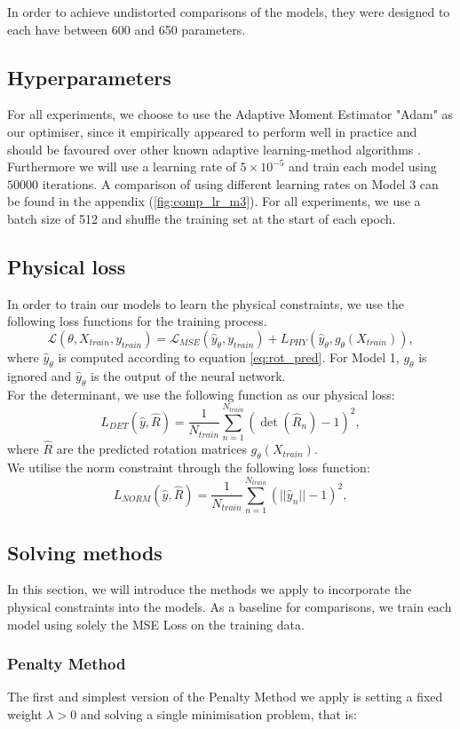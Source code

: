 \indent In order to achieve undistorted comparisons of the models, they were designed to each have between 600 and 650 parameters.

\subsection{Hyperparameters}
For all experiments, we choose to use the Adaptive Moment Estimator "Adam" as our optimiser, since it empirically appeared to perform well in practice and should be favoured over other known adaptive learning-method algorithms \cite{DBLP:journals/corr/Ruder16}. Furthermore we will use a learning rate of $5\times 10^{-5}$ and train each model using $50000$ iterations. A comparison of using different learning rates on Model 3 can be found in the appendix (\ref{fig:comp_lr_m3}). For all experiments, we use a batch size of 512 and shuffle the training set at the start of each epoch.

\subsection{Physical loss}
In order to train our models to learn the physical constraints, we use the following loss functions for the training process.
\[\mathcal{L}(\theta, X_{train}, y_{train}) = \mathcal{L}_{MSE}(\hat{y}_\theta, y_{train}) + L_{PHY}(\hat{y}_\theta, g_\theta(X_{train})),\]
where $\hat{y}_\theta$ is computed according to equation \ref{eq:rot_pred}. For Model 1, $g_\theta$ is ignored and $\hat{y}_\theta$ is the output of the neural network.\\
For the determinant, we use the following function as our physical loss:
\[L_{DET}(\hat{y}, \hat{R}) = \frac{1}{N_{train}}\sum_{n = 1}^{N_{train}}(\det(\hat{R}_n) - 1)^2,\]
where $\hat{R}$ are the predicted rotation matrices $g_\theta(X_{train})$.\\
We utilise the norm constraint through the following loss function:
\[L_{NORM}(\hat{y}, \hat{R}) = \frac{1}{N_{train}}\sum_{n = 1}^{N_{train}}(||\hat{y}_n|| - 1)^2,\]

\subsection{Solving methods}
In this section, we will introduce the methods we apply to incorporate the physical constraints into the models. As a baseline for comparisons, we train each model using solely the MSE Loss on the training data.

\subsubsection{Penalty Method}
The first and simplest version of the Penalty Method we apply is setting a fixed weight $\lambda > 0$ and solving a single minimisation problem, that is:

